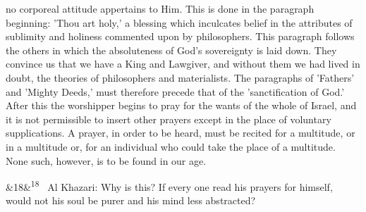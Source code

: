 \documentclass[12pt]{article}
\newcommand{\para}[1][]{\par\noindent\ifx&#1&\else\textsuperscript{\footnotesize #1}~\fi}
\begin{document}
no corporeal attitude appertains to Him. This is done in the paragraph beginning: 'Thou art holy,' a blessing which inculcates belief in the attributes of sublimity and holiness commented upon by philosophers. This paragraph follows the others in which the absoluteness of God's sovereignty is laid down. They convince us that we have a King and Lawgiver, and without them we had lived in doubt, the theories of philosophers and materialists. The paragraphs of 'Fathers' and 'Mighty Deeds,' must therefore precede that of the 'sanctification of God.' After this the worshipper begins to pray for the wants of the whole of Israel, and it is not permissible to insert other prayers except in the place of voluntary supplications. A prayer, in order to be heard, must be recited for a multitude, or in a multitude or, for an individual who could take the place of a multitude. None such, however, is to be found in our age.

\para[18] Al Khazari: Why is this? If every one read his prayers for himself, would not his soul be purer and his mind less abstracted?
\end{document}
